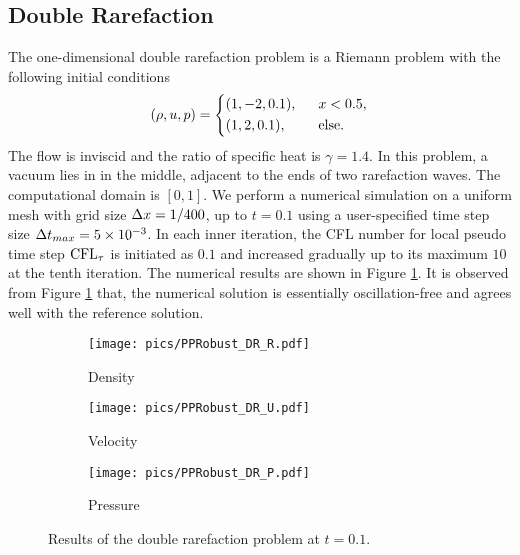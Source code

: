\subsection{Double Rarefaction}

The one-dimensional double rarefaction problem \cite{hu2004kineticDoubleRare}
is a Riemann problem with the following initial conditions
\begin{equation}
    (\rho,u,p) = \begin{dcases}
        (1,-2,0.1),\ \  & x < 0.5,       \\
        (1,2,0.1),\ \   & \mathrm{else}.
    \end{dcases}
\end{equation}
The flow is inviscid and the ratio of specific heat is $\gamma=1.4$.
In this problem, a vacuum lies in in the middle, adjacent to the ends of two rarefaction waves.
The computational domain is $[0,1]$.
We perform a numerical simulation on a uniform mesh with grid size $\mathrm\Delta x = 1/400$, up to $t=0.1$ using a user-specified time step size $\mathrm\Delta t_{max}= 5 \times 10 ^{-3}$.
In each inner iteration, the CFL number for local pseudo time step $\text{CFL}_\tau$ is initiated as $0.1$ and 
increased gradually up to its maximum $10$ at the tenth iteration.
The numerical results are shown in Figure \ref{fig:doubleRare}. It is observed from Figure \ref{fig:doubleRare} that, the numerical solution is essentially oscillation-free and agrees well with the reference solution.

\begin{figure}[htbp]
    \centering
    \begin{subfigure}{0.33\textwidth}
        \texttt{[image: pics/PPRobust\_DR\_R.pdf]}
        \caption[]{Density}
    \end{subfigure}\hfill
    \begin{subfigure}{0.33\textwidth}
        \texttt{[image: pics/PPRobust\_DR\_U.pdf]}
        \caption[]{Velocity}
    \end{subfigure}\hfill
    \begin{subfigure}{0.33\textwidth}
        \texttt{[image: pics/PPRobust\_DR\_P.pdf]}
        \caption[]{Pressure}
    \end{subfigure}
    \caption{Results of the double rarefaction problem at $t=0.1$.}
    \label{fig:doubleRare}
\end{figure}

